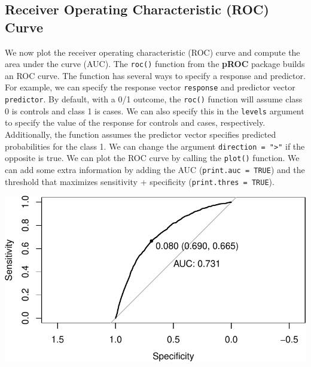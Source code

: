 \documentclass[
  letterpaper,
]{krantz}
\makeatletter
\newenvironment{Shaded}{\begin{snugshade}}{\end{snugshade}}
\newcommand{\AttributeTok}[1]{\textcolor[rgb]{0.40,0.45,0.13}{#1}}
\newcommand{\ConstantTok}[1]{\textcolor[rgb]{0.56,0.35,0.01}{#1}}
\newcommand{\DecValTok}[1]{\textcolor[rgb]{0.68,0.00,0.00}{#1}}
\newcommand{\FunctionTok}[1]{\textcolor[rgb]{0.28,0.35,0.67}{#1}}
\newcommand{\NormalTok}[1]{\textcolor[rgb]{0.00,0.23,0.31}{#1}}
\newcommand{\OtherTok}[1]{\textcolor[rgb]{0.00,0.23,0.31}{#1}}
\newcommand{\SpecialCharTok}[1]{\textcolor[rgb]{0.37,0.37,0.37}{#1}}
\newcommand{\StringTok}[1]{\textcolor[rgb]{0.13,0.47,0.30}{#1}}
\newenvironment{kframe}{%
\medskip{}
\setlength{\fboxsep}{.8em}
 \def\at@end@of@kframe{}%
 \ifinner\ifhmode%
  \def\at@end@of@kframe{\end{minipage}}%
  \begin{minipage}{\columnwidth}%
 \fi\fi%
 \def\FrameCommand##1{\hskip\@totalleftmargin \hskip-\fboxsep
 \colorbox{shadecolor}{##1}\hskip-\fboxsep
     \hskip-\linewidth \hskip-\@totalleftmargin \hskip\columnwidth}%
 \MakeFramed {\advance\hsize-\width
   \@totalleftmargin\z@ \linewidth\hsize
   \@setminipage}}%
 {\par\unskip\endMakeFramed%
 \at@end@of@kframe}
\renewenvironment{Shaded}{\begin{kframe}}{\end{kframe}}
\makeatother
\begin{document}
\subsection{Receiver Operating Characteristic (ROC)
Curve}\label{receiver-operating-characteristic-roc-curve}

We now plot the receiver operating characteristic (ROC) curve and
compute the area under the curve (AUC). The \texttt{roc()} function from
the \textbf{pROC} package builds an ROC curve. The function has several
ways to specify a response and predictor. For example, we can specify
the response vector \texttt{response} and predictor vector
\texttt{predictor}. By default, with a 0/1 outcome, the \texttt{roc()}
function will assume class 0 is controls and class 1 is cases. We can
also specify this in the \texttt{levels} argument to specify the value
of the response for controls and cases, respectively. Additionally, the
function assumes the predictor vector specifies predicted probabilities
for the class 1. We can change the argument
\texttt{direction\ =\ "\textgreater{}"} if the opposite is true. We can
plot the ROC curve by calling the \texttt{plot()} function. We can add
some extra information by adding the AUC (\texttt{print.auc\ =\ TRUE})
and the threshold that maximizes sensitivity + specificity
(\texttt{print.thres\ =\ TRUE}).

\begin{Shaded}
\end{Shaded}

\begin{center}
\includegraphics[width=1\textwidth,height=\textheight]{book/logistic_regression_files/figure-pdf/unnamed-chunk-10-1.pdf}
\end{center}
\end{document}
